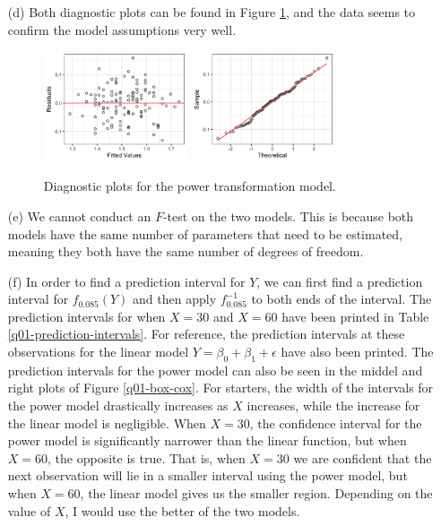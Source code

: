 \documentclass[10pt]{article}
\begin{document}
\begin{itemize}
    \item[(d)] Both diagnostic plots can be found in Figure \ref{q01-diagnostics}, and the data seems to confirm the model assumptions very well.
    \begin{figure}[ht]
        \centering
        \includegraphics[width = 0.4\textwidth]{img/q01-diagnostic-residuals.png}
        \quad
        \includegraphics[width = 0.4\textwidth]{img/q01-diagnostic-qqplot.png}
        \caption{Diagnostic plots for the power transformation model.}
        \label{q01-diagnostics}
    \end{figure}

    \item[(e)] We cannot conduct an \(F\)-test on the two models. This is because both models have the same number of parameters that need to be estimated,
    meaning they both have the same number of degrees of freedom. 

    \item[(f)] In order to find a prediction interval for \(Y\), we can first find a prediction interval for \(f_{0.085}(Y)\) and then apply \(f_{0.085}^{-1}\)
    to both ends of the interval. The prediction intervals for when \(X = 30\) and \(X = 60\) have been printed in Table \ref{q01-prediction-intervals}. 
    For reference, the prediction intervals at these observations for the linear model \(Y = \beta_0 + \beta_1 + \epsilon\) have also been printed. 
    The prediction intervals for the power model can also be seen in the middel and right plots of Figure \ref{q01-box-cox}. 
    For starters, the width of the intervals for the power model drastically increases as \(X\) increases, while the increase for the linear model is negligible. 
    When \(X = 30\), the confidence interval for the power model is significantly narrower than the linear function, but when \(X = 60\), the opposite is true. 
    That is, when \(X = 30\) we are confident that the next observation will lie in a smaller interval using the power model, but when \(X = 60\), the linear model 
    gives us the smaller region. Depending on the value of \(X\), I would use the better of the two models. 


\end{itemize}
\end{document}

